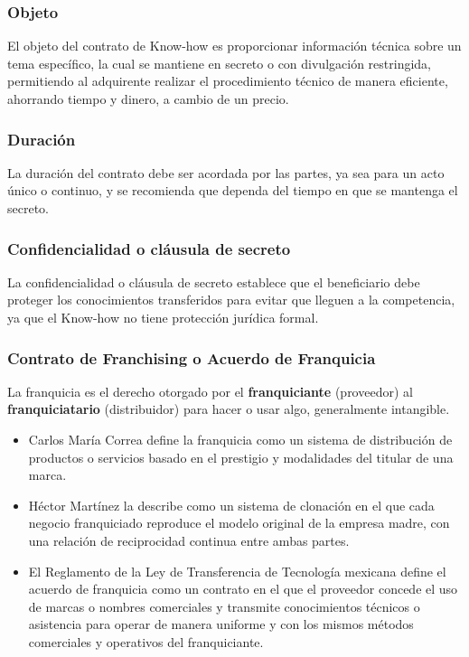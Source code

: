 \documentclass{templateNote}
\begin{document}
\subsubsection*{Objeto}

El objeto del contrato de Know-how es proporcionar información técnica sobre un tema específico, la cual se mantiene en secreto o con divulgación restringida, permitiendo al adquirente realizar el procedimiento técnico de manera eficiente, ahorrando tiempo y dinero, a cambio de un precio.

\subsubsection*{Duración}
La duración del contrato debe ser acordada por las partes, ya sea para un acto único o continuo, y se recomienda que dependa del tiempo en que se mantenga el secreto.

\subsubsection*{Confidencialidad o cláusula de secreto}
La confidencialidad o cláusula de secreto establece que el beneficiario debe proteger los conocimientos transferidos para evitar que lleguen a la competencia, ya que el Know-how no tiene protección jurídica formal.


\subsubsection{Contrato de Franchising o Acuerdo de Franquicia}
La franquicia es el derecho otorgado por el \textbf{franquiciante} (proveedor) al \textbf{franquiciatario} (distribuidor) para hacer o usar algo, generalmente intangible.
\begin{itemize}
    \item Carlos María Correa define la franquicia como un sistema de distribución de productos o servicios basado en el prestigio y modalidades del titular de una marca. 
    \item Héctor Martínez la describe como un sistema de clonación en el que cada negocio franquiciado reproduce el modelo original de la empresa madre, con una relación de reciprocidad continua entre ambas partes.
    \item El Reglamento de la Ley de Transferencia de Tecnología mexicana define el acuerdo de franquicia como un contrato en el que el proveedor concede el uso de marcas o nombres comerciales y transmite conocimientos técnicos o asistencia para operar de manera uniforme y con los mismos métodos comerciales y operativos del franquiciante.
\end{itemize}
\end{document}
